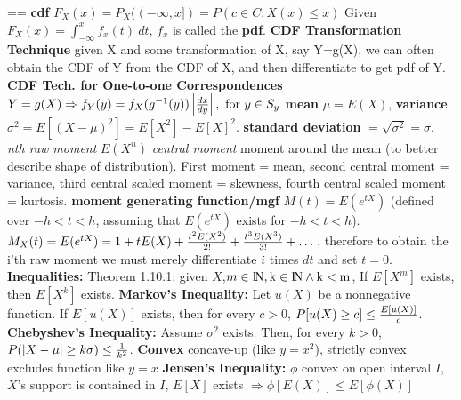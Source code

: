 \setbox\bigbox=\vbox{\hsize=\strutA{\splittopskip}{0pt}%
%
%
%
%
%
%
%
%
{\bf cdf} $F_X(x) = P_X((-\infty,x])=P({c\in C : X(x)\le x})$\quad
Given $F_X(x) = \int_{-\infty}^xf_x(t)\ dt$, $f_x$ is called the {\bf pdf}.\quad
{\bf CDF Transformation Technique} given X and some transformation of X, say Y=g(X), we can often obtain the CDF of Y from the CDF of X, and then differentiate to get pdf of Y.\quad
{\bf CDF Tech. for One-to-one Correspondences} $Y=g(X) \Rightarrow f_Y(y) = f_X(g^{-1}(y)) \left|{dx \over dy}\right|,\ {\rm for}\ y \in S_y$\quad
{}%
%
{\bf mean} $\mu = E(X)$, {\bf variance} $\sigma^2=E[(X-\mu)^2]=E[X^2]-E[X]^2$. {\bf standard deviation } $=\sqrt{\sigma^2}=\sigma$.
{\it nth raw moment} $E(X^n)$ {\it central moment} moment around the mean (to better describe shape of distribution).
First moment = mean, second central moment = variance, third central scaled moment = skewness, fourth central scaled moment = kurtosis.
{\bf moment generating function/mgf } $M(t)=E(e^{tX})$ (defined over $-h < t < h$, assuming that $E(e^{tX})$ exists for $-h < t < h$).
$M_X(t)=E(e^{tX})=1+tE(X)+{t^2E(X^2) \over 2!} + {t^3E(X^3) \over 3!} + \dots$, therefore to obtain the i'th raw moment we must merely differentiate $i$ times $dt$ and set $t=0$.
{\bf Inequalities:} Theorem 1.10.1: given $X$,$m \in \rm I\!N, k \in \rm I\!N \land k < m$, If $E[X^m]$ exists, then $E[X^k]$ exists.\quad
{\bf Markov's Inequality:} Let $u(X)$ be a nonnegative function.  If $E[u(X)]$ exists, then for every $c > 0$, $P[u(X) \geq c] \leq {E[u(X)]\over c}$.\quad
{\bf Chebyshev's Inequality:} Assume $\sigma^2$ exists.  Then, for every $k>0$, $P(|X-\mu| \geq k\sigma) \leq {1 \over k^2}$.\quad 
{\bf Convex } concave-up (like $y=x^2$), strictly convex excludes function like $y=x$\quad%
{\bf Jensen's Inequality:} $\phi$ convex on open interval $I$, $X$'s support is contained in $I$, $E[X]$ exists $\Rightarrow \phi[E(X)]\leq E[\phi(X)]$\quad 
\lpiflong{

}}
